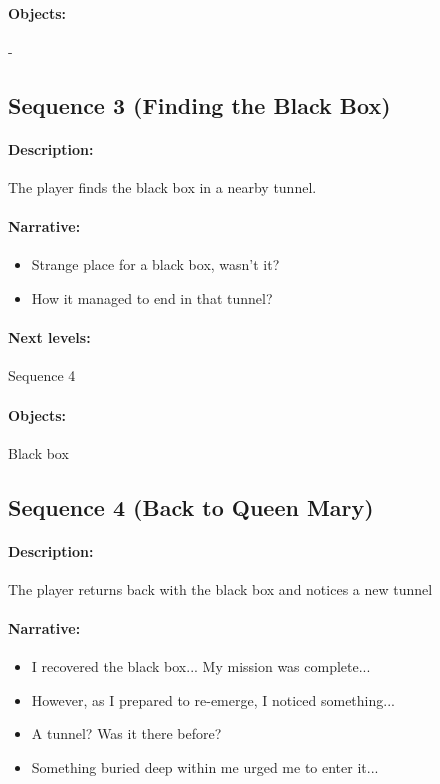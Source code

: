 \documentclass{article}
\begin{document}
\paragraph{Objects: } -

\subsection{Sequence 3 (Finding the Black Box)}

\paragraph{Description: } The player finds the black box in a nearby tunnel.
\paragraph{Narrative: } 
\begin{itemize}
\item Strange place for a black box, wasn't it?
\item How it managed to end in that tunnel?
\end{itemize}
\paragraph{Next levels: } Sequence 4
\paragraph{Objects: } Black box

\subsection{Sequence 4 (Back to Queen Mary)}

\paragraph{Description: } The player returns back with the black box and notices a new tunnel
\paragraph{Narrative: } 
\begin{itemize}
\item I recovered the black box... My mission was complete...
\item However, as I prepared to re-emerge, I noticed something...
\item A tunnel? Was it there before?
\item Something buried deep within me urged me to enter it...
\end{itemize}
\end{document}
